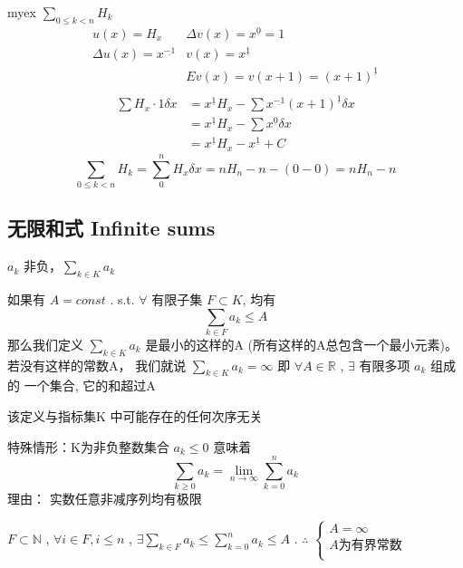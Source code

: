\documentclass[mode=geye]{elegantnote}
\newcommand{\fallingfactorial}[1]{%
  ^{\underline{#1}}%
}
\begin{document}
myex $ \sum_{0\leqslant k < n}H_k $ 
\begin{equation*}
    \begin{array}{ll}
        u(x) = H_x & \Delta v(x) = x\fallingfactorial{0}=1 \\
        \Delta u(x) = x\fallingfactorial{-1} & v(x) = x\fallingfactorial{1} \\
        & E v(x) = v(x+1) = (x+1)\fallingfactorial{1}\\
    \end{array}
\end{equation*}
\begin{align*}
    \sum H_x\cdot 1 \delta x
    &= x\fallingfactorial{1}H_x - \sum x\fallingfactorial{-1}(x+1)\fallingfactorial{1} \delta x\\
    &= x\fallingfactorial{1}H_x - \sum x\fallingfactorial{0}\delta x\\
    &= x\fallingfactorial{1}H_x - x\fallingfactorial{1} + C
\end{align*}
\begin{equation*}
    \sum_{0\leqslant k<n}H_k = \sum_{0}^{n}H_x\delta x = n H_n - n - (0-0) = n H_n - n
\end{equation*}

\subsection{无限和式 Infinite sums}
$ a_k $ 非负，$ \sum_{k\in K} a_k$ 
\begin{definition}
    如果有 $ A= const $ . s.t. $ \forall $ 有限⼦集 $ F\subset K $, 均有
    \begin{equation*}
        \sum_{k\in F}a_k \leqslant A
    \end{equation*}
    那么我们定义 $ \sum_{k\in K} a_k$ 是最小的这样的A
    (所有这样的A总包含⼀个最小元素)。
    若没有这样的常数A，
    我们就说 $ \sum_{k\in K} a_k = \infty $
    即
    $ \forall A\in \mathbb{R} $ , $ \exists $ 
    有限多项 $ a_k $ 组成的
    ⼀个集合, 它的和超过A
\end{definition}
该定义与指标集K 中可能存在的任何次序⽆关

特殊情形：K为非负整数集合
$ a_k \leqslant 0 $ 意味着
\begin{equation*}
    \sum_{k\geqslant 0} a_k = \lim_{n\rightarrow \infty}\sum_{k=0}^{n}a_k
\end{equation*}
理由： 实数任意非减序列均有极限

$  F \subset \mathbb{N} $ , $ \forall i\in F, i\leqslant n $ , $ \exists \sum_{k\in F}a_k \leqslant \sum_{k=0}^{n}a_k \leqslant A $ . \;
 $ \therefore $  $  \left\{\begin{array}{l}
    A=\infty\\
    A\text{为有界常数}\\
\end{array}\right. $ 
\end{document}
